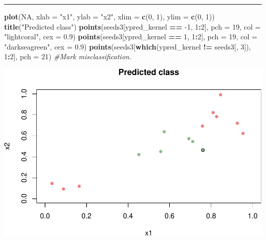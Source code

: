 \documentclass[]{article}
\newenvironment{Shaded}{\begin{snugshade}}{\end{snugshade}}
\newcommand{\CommentTok}[1]{\textcolor[rgb]{0.56,0.35,0.01}{\textit{#1}}}
\newcommand{\DataTypeTok}[1]{\textcolor[rgb]{0.13,0.29,0.53}{#1}}
\newcommand{\DecValTok}[1]{\textcolor[rgb]{0.00,0.00,0.81}{#1}}
\newcommand{\FloatTok}[1]{\textcolor[rgb]{0.00,0.00,0.81}{#1}}
\newcommand{\KeywordTok}[1]{\textcolor[rgb]{0.13,0.29,0.53}{\textbf{#1}}}
\newcommand{\NormalTok}[1]{#1}
\newcommand{\OperatorTok}[1]{\textcolor[rgb]{0.81,0.36,0.00}{\textbf{#1}}}
\newcommand{\OtherTok}[1]{\textcolor[rgb]{0.56,0.35,0.01}{#1}}
\newcommand{\StringTok}[1]{\textcolor[rgb]{0.31,0.60,0.02}{#1}}
\begin{document}
\begin{center}\rule{0.5\linewidth}{\linethickness}\end{center}

\begin{Shaded}
\begin{Highlighting}[]
\KeywordTok{plot}\NormalTok{(}\OtherTok{NA}\NormalTok{, }\DataTypeTok{xlab =} \StringTok{"x1"}\NormalTok{, }\DataTypeTok{ylab =} \StringTok{"x2"}\NormalTok{, }\DataTypeTok{xlim =} \KeywordTok{c}\NormalTok{(}\DecValTok{0}\NormalTok{, }\DecValTok{1}\NormalTok{), }\DataTypeTok{ylim =} \KeywordTok{c}\NormalTok{(}\DecValTok{0}\NormalTok{, }\DecValTok{1}\NormalTok{))}
\KeywordTok{title}\NormalTok{(}\StringTok{"Predicted class"}\NormalTok{)}
\KeywordTok{points}\NormalTok{(seeds3[ypred_kernel }\OperatorTok{==}\StringTok{ }\DecValTok{-1}\NormalTok{, }\DecValTok{1}\OperatorTok{:}\DecValTok{2}\NormalTok{], }\DataTypeTok{pch =} \DecValTok{19}\NormalTok{, }\DataTypeTok{col =} \StringTok{"lightcoral"}\NormalTok{, }
    \DataTypeTok{cex =} \FloatTok{0.9}\NormalTok{)}
\KeywordTok{points}\NormalTok{(seeds3[ypred_kernel }\OperatorTok{==}\StringTok{ }\DecValTok{1}\NormalTok{, }\DecValTok{1}\OperatorTok{:}\DecValTok{2}\NormalTok{], }\DataTypeTok{pch =} \DecValTok{19}\NormalTok{, }\DataTypeTok{col =} \StringTok{"darkseagreen"}\NormalTok{, }
    \DataTypeTok{cex =} \FloatTok{0.9}\NormalTok{)}
\KeywordTok{points}\NormalTok{(seeds3[}\KeywordTok{which}\NormalTok{(ypred_kernel }\OperatorTok{!=}\StringTok{ }\NormalTok{seeds3[, }\DecValTok{3}\NormalTok{]), }\DecValTok{1}\OperatorTok{:}\DecValTok{2}\NormalTok{], }\DataTypeTok{pch =} \DecValTok{21}\NormalTok{)  }\CommentTok{#Mark misclassification.}
\end{Highlighting}
\end{Shaded}

\includegraphics{9SVM_files/figure-latex/unnamed-chunk-27-1.pdf}
\end{document}
